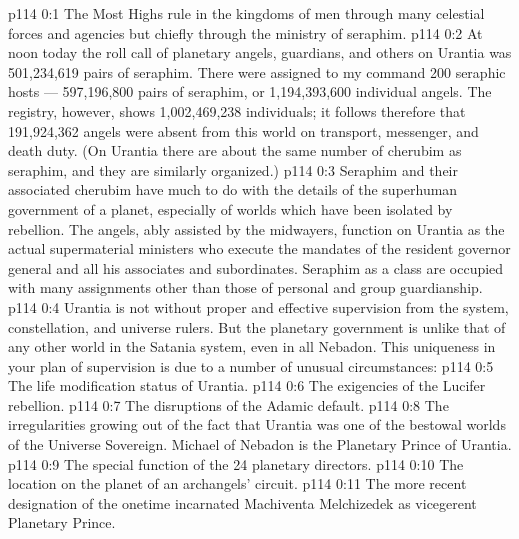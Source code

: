 \author{Chief of Seraphim}
\vs p114 0:1 The Most Highs rule in the kingdoms of men through many celestial forces and agencies but chiefly through the ministry of seraphim.
\vs p114 0:2 At noon today the roll call of planetary angels, guardians, and others on Urantia was 501,234,619 pairs of seraphim. There were assigned to my command 200 seraphic hosts --- 597,196,800 pairs of seraphim, or 1,194,393,600 individual angels. The registry, however, shows 1,002,469,238 individuals; it follows therefore that 191,924,362 angels were absent from this world on transport, messenger, and death duty. (On Urantia there are about the same number of cherubim as seraphim, and they are similarly organized.)
\vs p114 0:3 Seraphim and their associated cherubim have much to do with the details of the superhuman government of a planet, especially of worlds which have been isolated by rebellion. The angels, ably assisted by the midwayers, function on Urantia as the actual supermaterial ministers who execute the mandates of the resident governor general and all his associates and subordinates. Seraphim as a class are occupied with many assignments other than those of personal and group guardianship.
\vs p114 0:4 Urantia is not without proper and effective supervision from the system, constellation, and universe rulers. But the planetary government is unlike that of any other world in the Satania system, even in all Nebadon. This uniqueness in your plan of supervision is due to a number of unusual circumstances:
\vs p114 0:5 \bibnobreakspace The life modification status of Urantia.
\vs p114 0:6 \bibnobreakspace The exigencies of the Lucifer rebellion.
\vs p114 0:7 \bibnobreakspace The disruptions of the Adamic default.
\vs p114 0:8 \bibnobreakspace The irregularities growing out of the fact that Urantia was one of the bestowal worlds of the Universe Sovereign. Michael of Nebadon is the Planetary Prince of Urantia.
\vs p114 0:9 \bibnobreakspace The special function of the 24 planetary directors.
\vs p114 0:10 \bibnobreakspace The location on the planet of an archangels’ circuit.
\vs p114 0:11 \bibnobreakspace The more recent designation of the onetime incarnated Machiventa Melchizedek as vicegerent Planetary Prince.
